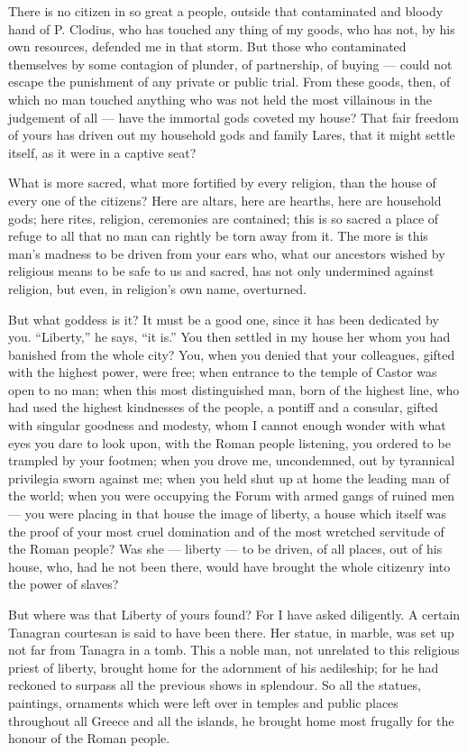  There is no citizen in so great a people, outside that contaminated and bloody hand of P. Clodius, who has touched any thing of my goods, who has not, by his own resources, defended me in that storm. But those who contaminated themselves by some contagion of plunder, of partnership, of buying --- could not escape the punishment of any private or public trial. From these goods, then, of which no man touched anything who was not held the most villainous in the judgement of all --- have the immortal gods coveted my house? That fair freedom of yours has driven out my household gods and family Lares, that it might settle itself, as it were in a captive seat?

 What is more sacred, what more fortified by every religion, than the house of every one of the citizens? Here are altars, here are hearths, here are household gods; here rites, religion, ceremonies are contained; this is so sacred a place of refuge to all that no man can rightly be torn away from it. The more is this man's madness to be driven from your ears who, what our ancestors wished by religious means to be safe to us and sacred, has not only undermined against religion, but even, in religion's own name, overturned.

 But what goddess is it? It must be a good one, since it has been dedicated by you. ``Liberty,'' he says, ``it is.'' You then settled in my house her whom you had banished from the whole city? You, when you denied that your colleagues, gifted with the highest power, were free; when entrance to the temple of Castor was open to no man; when this most distinguished man, born of the highest line, who had used the highest kindnesses of the people, a pontiff and a consular, gifted with singular goodness and modesty, whom I cannot enough wonder with what eyes you dare to look upon, with the Roman people listening, you ordered to be trampled by your footmen; when you drove me, uncondemned, out by tyrannical privilegia sworn against me; when you held shut up at home the leading man of the world; when you were occupying the Forum with armed gangs of ruined men --- you were placing in that house the image of liberty, a house which itself was the proof of your most cruel domination and of the most wretched servitude of the Roman people? Was she --- liberty --- to be driven, of all places, out of his house, who, had he not been there, would have brought the whole citizenry into the power of slaves?

 But where was that Liberty of yours found? For I have asked diligently. A certain Tanagran courtesan is said to have been there. Her statue, in marble, was set up not far from Tanagra in a tomb. This a noble man, not unrelated to this religious priest of liberty, brought home for the adornment of his aedileship; for he had reckoned to surpass all the previous shows in splendour. So all the statues, paintings, ornaments which were left over in temples and public places throughout all Greece and all the islands, he brought home most frugally for the honour of the Roman people.

